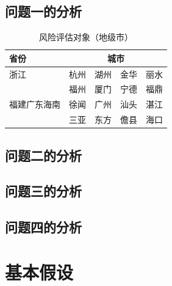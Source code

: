 \documentclass{cumcmthesis}
\begin{document}
\subsection{问题一的分析}   
\begin{table}[htbp]
    \centering
    \caption{风险评估对象（地级市）}
    \label{table1}
    \begin{tabular}{m{}<{\centering}|
        m{}<{\centering}m{}<{\centering}
        m{}<{\centering}m{}<{\centering}}
    \toprule[2pt]
         省份  &  \multicolumn{4}{c}{城市}  \\%
    \midrule[1pt]
        浙江  &  杭州  &  湖州  &  金华  &  丽水  \\
        \cline{1-3}
        \multirow{3}{0.1\textwidth}{福建广东海南}
        &  福州  &  厦门  &  宁德  &  福鼎  \\
        &  徐闻  &  广州  &  汕头  \vline&  湛江  \\
        &  三亚  &  东方  &  儋县  &  海口  \\
    \bottomrule[1.5pt]
    \end{tabular}
\end{table}       

\subsection{问题二的分析}
        

\subsection{问题三的分析}
        

\subsection{问题四的分析}
     

\section{基本假设}
    
\end{document}
